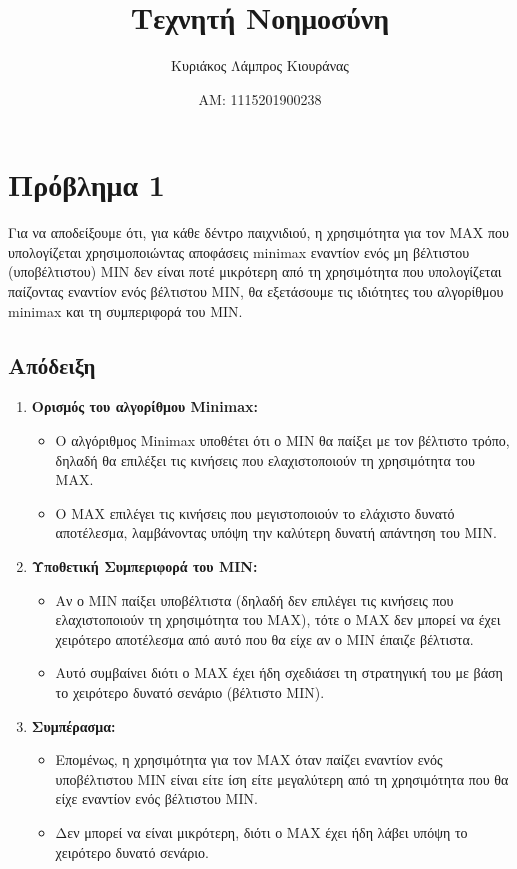 \documentclass{article}
\title{Τεχνητή Νοημοσύνη}
\author{Κυριάκος Λάμπρος Κιουράνας}
\date{ΑΜ: 1115201900238}
\begin{document}
\maketitle

\section*{Πρόβλημα 1}

Για να αποδείξουμε ότι, για κάθε δέντρο παιχνιδιού, η χρησιμότητα για τον MAX που υπολογίζεται χρησιμοποιώντας αποφάσεις minimax εναντίον ενός μη βέλτιστου (υποβέλτιστου) MIN δεν είναι ποτέ μικρότερη από τη χρησιμότητα που υπολογίζεται παίζοντας εναντίον ενός βέλτιστου MIN, θα εξετάσουμε τις ιδιότητες του αλγορίθμου minimax και τη συμπεριφορά του MIN.

\subsection*{Απόδειξη}

\begin{enumerate}
    \item \textbf{Ορισμός του αλγορίθμου Minimax:}
    \begin{itemize}
        \item Ο αλγόριθμος Minimax υποθέτει ότι ο MIN θα παίξει με τον βέλτιστο τρόπο, δηλαδή θα επιλέξει τις κινήσεις που ελαχιστοποιούν τη χρησιμότητα του MAX.
        \item Ο MAX επιλέγει τις κινήσεις που μεγιστοποιούν το ελάχιστο δυνατό αποτέλεσμα, λαμβάνοντας υπόψη την καλύτερη δυνατή απάντηση του MIN.
    \end{itemize}

    \item \textbf{Υποθετική Συμπεριφορά του MIN:}
    \begin{itemize}
        \item Αν ο MIN παίξει υποβέλτιστα (δηλαδή δεν επιλέγει τις κινήσεις που ελαχιστοποιούν τη χρησιμότητα του MAX), τότε ο MAX δεν μπορεί να έχει χειρότερο αποτέλεσμα από αυτό που θα είχε αν ο MIN έπαιζε βέλτιστα.
        \item Αυτό συμβαίνει διότι ο MAX έχει ήδη σχεδιάσει τη στρατηγική του με βάση το χειρότερο δυνατό σενάριο (βέλτιστο MIN).
    \end{itemize}

    \item \textbf{Συμπέρασμα:}
    \begin{itemize}
        \item Επομένως, η χρησιμότητα για τον MAX όταν παίζει εναντίον ενός υποβέλτιστου MIN είναι είτε ίση είτε μεγαλύτερη από τη χρησιμότητα που θα είχε εναντίον ενός βέλτιστου MIN.
        \item Δεν μπορεί να είναι μικρότερη, διότι ο MAX έχει ήδη λάβει υπόψη το χειρότερο δυνατό σενάριο.
    \end{itemize}
\end{enumerate}
\end{document}
